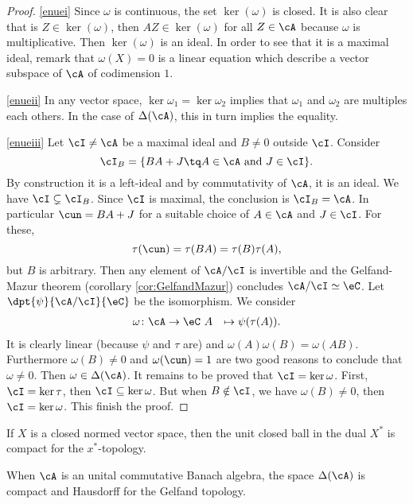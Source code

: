 \begin{proof}
\ref{enuei} Since $\omega$ is continuous, the set $\ker(\omega)$ is closed. It is also clear that is $Z\in\ker(\omega)$, then $AZ\in\ker(\omega)$ for all $Z\in\cA$ because $\omega$ is multiplicative. Then $\ker(\omega)$ is an ideal. In order to see that it is a maximal ideal, remark that $\omega(X)=0$ is a linear equation which describe a vector subspace of $\cA$ of codimension\label{pg_codimun} $1$.

\ref{enueii} In any vector space, $\ker{\omega_1}=\ker{\omega_2}$ implies that $\omega_1$ and $\omega_2$ are multiples each others. In the case of $\Delta(\cA)$, this in turn implies the equality.

\ref{enueiii} Let $\cI\neq\cA$ be a maximal ideal and $B\neq 0$ outside $\cI$. Consider
\[
\cI_B=\{BA+J\tq A\in\cA\textrm{ and }J\in\cI\}.
\]
By construction it is a left-ideal and by commutativity of $\cA$, it is an ideal. We have $\cI\subsetneq\cI_B$. Since $\cI$ is maximal, the conclusion is $\cI_B=\cA$. In particular $\cun=BA+J$ for a suitable choice of $A\in\cA$ and $J\in\cI$. For these,
\[
  \tau(\cun)=\tau(BA)=\tau(B)\tau(A),
\]
but $B$ is arbitrary. Then any element of $\cA/\cI$ is invertible and the Gelfand-Mazur theorem (corollary \ref{cor:GelfandMazur}) concludes $\cA/\cI\simeq\eC$. Let $\dpt{\psi}{\cA/\cI}{\eC}$ be the isomorphism. We consider
        \begin{equation}
        \begin{aligned}
            \omega \colon \cA &\to \eC\
            A&\mapsto \psi(\tau(A)).
        \end{aligned}
    \end{equation}  
It is clearly linear (because $\psi$ and $\tau$ are) and $\omega(A)\omega(B)=\omega(AB)$. Furthermore $\omega(B)\neq 0$ and $\omega(\cun)=1$ are two good reasons to conclude that $\omega\neq 0$. Then $\omega\in\Delta(\cA)$. It remains to be proved that $\cI=\ker\omega$. First, $\cI=\ker\tau$, then $\cI\subseteq\ker\omega$. But when $B\notin\cI$, we have $\omega(B)\neq 0$, then $\cI=\ker\omega$. This finish the proof.
\end{proof}


\begin{theorem} 
If $X$ is a closed normed vector space, then the unit closed ball in the dual $X^*$ is compact for the $x^*$-topology.
 \label{tho:Banach_Alaoglu}
\end{theorem}

\begin{proposition}
When $\cA$ is an unital commutative Banach algebra, the space $\Delta(\cA)$ is compact and Hausdorff for the Gelfand topology.
\end{proposition} \label{prop:DcA_comp_Hauss}

